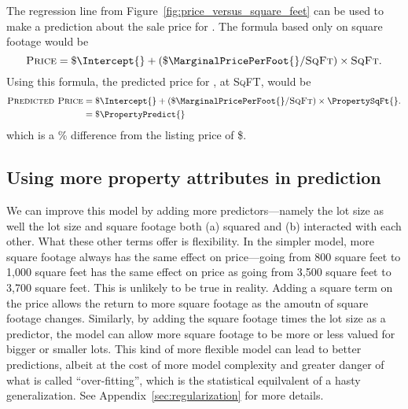 \documentclass[
12pt, %
letterpaper, %
oneside, %
headinclude,footinclude, %
BCOR5mm, %
]{scrartcl}
\begin{document}
The regression line from Figure~\ref{fig:price_versus_square_feet} can be used to make a prediction about the sale price for \PropertyName{}. 
The formula based only on square footage would be
\begin{equation}
  \textsc{Price} = \$ \Intercept{} + (\$ \MarginalPricePerFoot{}/\textsc{SqFt}) \times \textsc{SqFt}. \nonumber
\end{equation}
Using this formula, the predicted price for \PropertyName{}, at \PropertySqFt{} \textsc{SqFT}, would be
\begin{align}
\textsc{Predicted Price} & = \$ \Intercept{} + (\$ \MarginalPricePerFoot{}/\textsc{SqFt}) \times \PropertySqFt{}. \\ \nonumber
                         & = \$ \PropertyPredict{} \nonumber 
\end{align}
which is a \PctDiff{}\% difference from the listing price of \$\PropertyPrice{}.



\subsection{Using more property attributes in prediction}
We can improve this model by adding more predictors---namely the lot size as well the lot size and square footage both (a) squared and (b) interacted with each other.
What these other terms offer is flexibility.
In the simpler model, more square footage always has the same effect on price---going from 800 square feet to 1,000 square feet has the same effect on price as going from 3,500 square feet to 3,700 square feet.
This is unlikely to be true in reality.
Adding a square term on the price allows the return to more square footage as the amoutn of square footage changes.
Similarly, by adding the square footage times the lot size as a predictor, the model can allow more square footage to be more or less valued for bigger or smaller lots. 
This kind of more flexible model can lead to better predictions, albeit at the cost of more model complexity and greater danger of what is called ``over-fitting'', which is the statistical equilvalent of a hasty generalization.
See Appendix~\ref{sec:regularization} for more details. 
\end{document}
